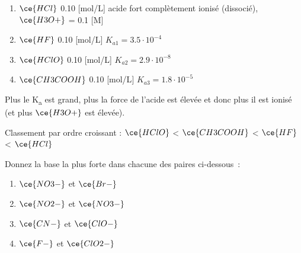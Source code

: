 \documentclass[
  11pt,
  french,
  a4paper,
  openany]{book}
\providecommand{\tightlist}{%
  \setlength{\itemsep}{0pt}\setlength{\parskip}{0pt}}
\begin{document}
\begin{Answer}

\begin{enumerate}
\def\labelenumi{\alph{enumi}.}
\tightlist
\item
  \(\ce{HCl}\) 0.10 {[}mol/L{]} \tabto{12em} acide fort complètement ionisé (dissocié), \textbar{}\(\ce{H3O+}\)\textbar{} = 0.1 {[}M{]}
  \vspace{1em}
\item
  \(\ce{HF}\) 0.10 {[}mol/L{]} \tabto{12em} \(K_{a1} = 3.5 \cdot 10^{-4}\)
  \vspace{1em}
\item
  \(\ce{HClO}\) 0.10 {[}mol/L{]} \tabto{12em} \(K_{a2} = 2.9 \cdot 10^{-8}\)
  \vspace{1em}
\item
  \(\ce{CH3COOH}\) 0.10 {[}mol/L{]} \tabto{12em} \(K_{a3} = 1.8 \cdot 10^{-5}\)
  \vspace{1em}
\end{enumerate}

Plus le K\textsubscript{a} est grand, plus la force de l'acide est élevée et donc plus il est ionisé (et plus \textbar{}\(\ce{H3O+}\)\textbar{} est élevée).

Classement par ordre croissant : \(\ce{HClO}\) \textless{} \(\ce{CH3COOH}\) \textless{} \(\ce{HF}\) \textless{} \(\ce{HCl}\)
\clearpage


\end{Answer}

\clearpage

\begin{Exercise}

Donnez la base la plus forte dans chacune des paires ci-dessous~:

\begin{enumerate}
\def\labelenumi{\alph{enumi}.}
\tightlist
\item
  \(\ce{NO3-}\) et \(\ce{Br-}\)
\item
  \(\ce{NO2-}\) et \(\ce{NO3-}\)
\item
  \(\ce{CN-}\) et \(\ce{ClO-}\)
\item
  \(\ce{F-}\) et \(\ce{ClO2-}\)
\end{enumerate}


\end{Exercise}
\end{document}
